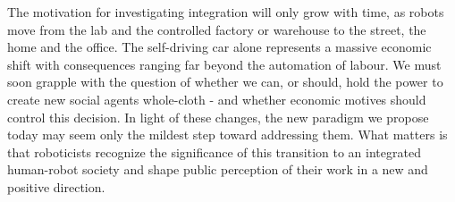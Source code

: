 \documentclass{sfuthesis}
\begin{document}
The motivation for investigating integration will only grow with time, as robots move from the lab and the controlled factory or warehouse to the street, the home and the office. The self-driving car alone represents a massive economic shift with consequences ranging far beyond the automation of labour. We must soon grapple with the question of whether we can, or should, hold the power to create new social agents whole-cloth - and whether economic motives should control this decision. In light of these changes, the new paradigm we propose today may seem only the mildest step toward addressing them. What matters is that roboticists recognize the significance of this transition to an integrated human-robot society and shape public perception of their work in a new and positive direction. 



%
%
%
%
%

\backmatter%
	
	

\end{document}
